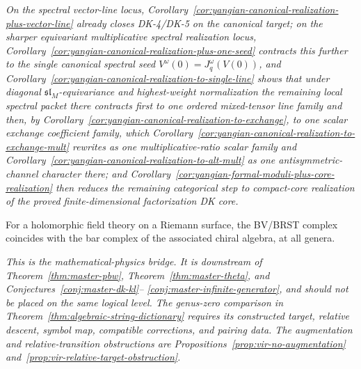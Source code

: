 \begin{conjecture}
\emph{On the spectral vector-line locus,
Corollary~\ref{cor:yangian-canonical-realization-plus-vector-line}
already closes DK-4/DK-5 on the canonical target; on the sharper
equivariant multiplicative spectral realization locus,
Corollary~\ref{cor:yangian-canonical-realization-plus-one-seed}
contracts this further to the single canonical spectral seed
\(V^\omega(0)=J_q^\omega(V(0))\), and
Corollary~\ref{cor:yangian-canonical-realization-to-single-line}
shows that under diagonal \(\mathfrak{sl}_M\)-equivariance and
highest-weight normalization the remaining local spectral packet there
contracts first to one ordered mixed-tensor line family and then, by
Corollary~\ref{cor:yangian-canonical-realization-to-exchange}, to one
scalar exchange coefficient family, which
Corollary~\ref{cor:yangian-canonical-realization-to-exchange-mult}
rewrites as one multiplicative-ratio scalar family and
Corollary~\ref{cor:yangian-canonical-realization-to-alt-mult} as one
antisymmetric-channel character there; and
Corollary~\ref{cor:yangian-formal-moduli-plus-core-realization}
then reduces the remaining categorical step to compact-core
realization of the proved finite-dimensional factorization DK core.}
\end{conjecture}

\begin{conjecture}
\label{conj:master-bv-brst}
\ClaimStatusConjectured{}
For a holomorphic field theory on a Riemann surface, the BV/BRST
complex coincides with the bar complex of the associated chiral algebra,
at all genera.

\emph{This is the mathematical-physics bridge.  It is
downstream of Theorem~\textup{\ref{thm:master-pbw}},
Theorem~\textup{\ref{thm:master-theta}}, and
Conjectures~\textup{\ref{conj:master-dk-kl}}--\textup{%
\ref{conj:master-infinite-generator}}, and should not be placed on the
same logical level. The genus-zero comparison in Theorem~\ref{thm:algebraic-string-dictionary} requires its constructed target, relative descent, symbol map, compatible corrections, and pairing data.
The augmentation and relative-transition obstructions are Propositions~\ref{prop:vir-no-augmentation} and~\ref{prop:vir-relative-target-obstruction}.}
\end{conjecture}

